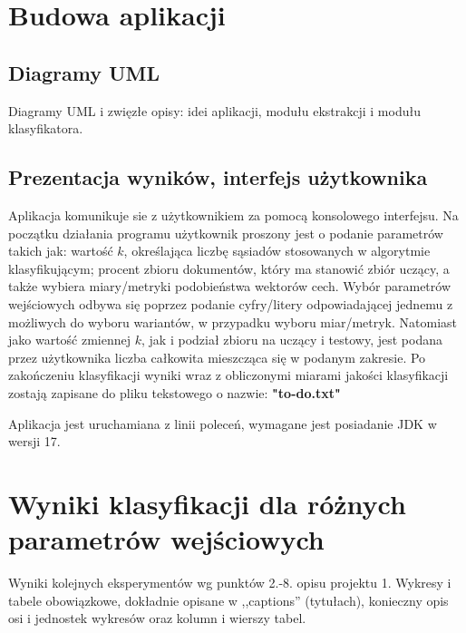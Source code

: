 \documentclass{classrep}
\begin{document}
\section{Budowa aplikacji}
\subsection{Diagramy UML}
Diagramy UML i zwięzłe opisy: idei aplikacji, modułu ekstrakcji i modułu
klasyfikatora.\\

\subsection{Prezentacja wyników, interfejs użytkownika}  
Aplikacja komunikuje sie z użytkownikiem za pomocą konsolowego interfejsu. Na początku działania programu użytkownik proszony jest o podanie parametrów takich jak:  
wartość $k$, określająca liczbę sąsiadów stosowanych w algorytmie klasyfikującym; 
procent zbioru dokumentów, który ma stanowić zbiór uczący, a także wybiera miary/metryki podobieństwa wektorów cech. Wybór parametrów wejściowych odbywa się poprzez podanie
cyfry/litery odpowiadającej jednemu z możliwych do wyboru wariantów, w przypadku wyboru miar/metryk. Natomiast jako wartość zmiennej $k$, jak i podział zbioru na uczący i testowy, jest podana przez użytkownika liczba całkowita mieszcząca się w podanym zakresie.
Po zakończeniu klasyfikacji wyniki wraz z obliczonymi miarami jakości klasyfikacji zostają zapisane do pliku tekstowego o nazwie: \textbf{"to-do.txt"}

Aplikacja jest uruchamiana z linii poleceń, wymagane jest posiadanie JDK w wersji 17. 


\section{Wyniki klasyfikacji dla różnych parametrów wejściowych}
Wyniki kolejnych eksperymentów wg punktów 2.-8. opisu projektu 1.  Wykresy i tabele
obowiązkowe, dokładnie opisane w ,,captions'' (tytułach), konieczny opis osi i
jednostek wykresów oraz kolumn i wierszy tabel.\\ 
\end{document}
